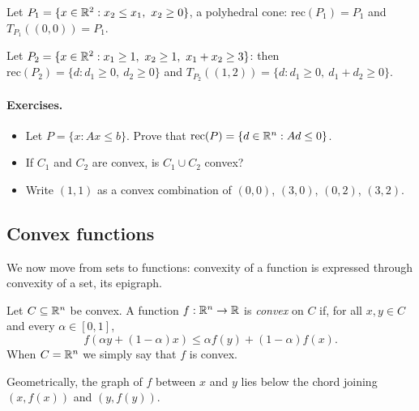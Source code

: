\begin{example}
Let $P_1 = \{x \in \mathbb{R}^2 : x_2 \le x_1,\ x_2 \ge 0\}$, a polyhedral cone: $\mathrm{rec}(P_1) = P_1$ and $T_{P_1}((0,0)) = P_1$.

Let $P_2 = \{x \in \mathbb{R}^2 : x_1 \ge 1,\ x_2 \ge 1,\ x_1 + x_2 \ge 3\}$: then $\mathrm{rec}(P_2) = \{d : d_1 \ge 0,\ d_2 \ge 0\}$ and $T_{P_2}((1,2)) = \{d : d_1 \ge 0,\ d_1 + d_2 \ge 0\}$.
\end{example}

\paragraph{Exercises.}
\begin{itemize}
    \item[1.2] Let $P = \{x : Ax \le b\}$. Prove that $\mathrm{rec}(P) = \{d \in \mathbb{R}^n : Ad \le 0\}$.
    \item[1.3] If $C_1$ and $C_2$ are convex, is $C_1 \cup C_2$ convex?
    \item[1.5] Write $(1,1)$ as a convex combination of $(0,0)$, $(3,0)$, $(0,2)$, $(3,2)$.
\end{itemize}

\subsection{Convex functions}

We now move from sets to functions: convexity of a function is expressed through convexity of a set, its epigraph.

\begin{definition}
Let $C \subseteq \mathbb{R}^n$ be convex. A function $f: \mathbb{R}^n \to \mathbb{R}$ is \emph{convex} on $C$ if, for all $x,y \in C$ and every $\alpha \in [0,1]$,
\[
    f(\alpha y + (1-\alpha)x) \le \alpha f(y) + (1-\alpha)f(x).
\]
When $C = \mathbb{R}^n$ we simply say that $f$ is convex.
\end{definition}

Geometrically, the graph of $f$ between $x$ and $y$ lies below the chord joining $(x, f(x))$ and $(y, f(y))$.

